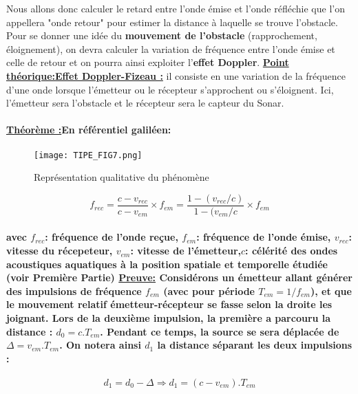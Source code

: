 \documentclass[a4paper,11pt]{article}
\begin{document}
{Nous allons donc calculer le retard entre l'onde \'{e}mise et l'onde r\'{e}fl\'{e}chie que l'on appellera "onde retour" pour estimer la distance \`{a} laquelle se trouve l'obstacle. Pour se donner une id\'{e}e du \textbf{mouvement de l'obstacle} (rapprochement, \'{e}loignement), on devra calculer la variation de fr\'{e}quence entre l'onde \'{e}mise et celle de retour et on pourra ainsi exploiter l'\textbf{effet Doppler}. \newline \newline
\textbf{\underline{Point th\'{e}orique:}}\newline\textbf{\underline{Effet Doppler-Fizeau :}} il consiste en une variation de la fr\'{e}quence d'une onde lorsque l'\'{e}metteur ou le r\'{e}cepteur s'approchent ou s'\'{e}loignent. Ici, l'\'{e}metteur sera l'obstacle et le r\'{e}cepteur sera le capteur du Sonar.}
\paragraph{\normalfont \textbf{\underline{Th\'{e}or\`{e}me :}}En r\'{e}f\'{e}rentiel galil\'{e}en:}
\begin{figure}[!h]
\texttt{[image: TIPE\_FIG7.png]}
\caption{Repr\'{e}sentation qualitative du ph\'{e}nom\`{e}ne}
\label{fig_7}
\end{figure}
\[f_{rec}=\frac{c-v_{rec}}{c-v_{em}}\times f_{em}=\frac{1-(v_{rec}/c)}{1-(v_{em}/c}\times f_{em}\]
\paragraph{\normalfont avec $f_{rec}$: fr\'{e}quence de l'onde re\c{c}ue, \newline $f_{em}$: fr\'{e}quence de l'onde \'{e}mise, \newline $v_{rec}$: vitesse du r\'{e}cepeteur, \newline $v_{em}$: vitesse de l'\'{e}metteur,\newline $c$: c\'{e}l\'{e}rit\'{e} des ondes acoustiques aquatiques \`{a} la position spatiale et temporelle \'{e}tudi\'{e}e (voir Premi\`{e}re Partie)\newline \newline
\underline{Preuve:} Consid\'{e}rons un \'{e}metteur allant g\'{e}n\'{e}rer des impulsions de fr\'{e}quence $f_{em}$ (avec pour p\'{e}riode $T_{em}=1/f_{em}$), et que le mouvement relatif \'{e}metteur-r\'{e}cepteur se fasse selon la droite les joignant. \newline
Lors de la deuxi\`{e}me impulsion, la premi\`{e}re a parcouru la distance : $d_0=c.T_{em}$. Pendant ce temps, la source se sera d\'{e}plac\'{e}e de $\Delta=v_{em}.T_{em}$. On notera ainsi $d_1$ la distance s\'{e}parant les deux impulsions :}
\[d_1=d_0-\Delta \Rightarrow d_1=(c-v_{em}).T_{em}\]
\end{document}
